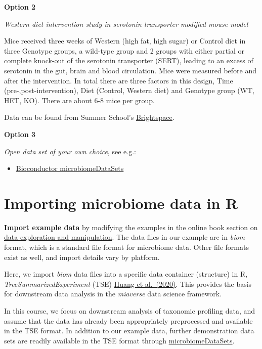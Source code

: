 \documentclass[
  oneside]{book}
\providecommand{\tightlist}{%
  \setlength{\itemsep}{0pt}\setlength{\parskip}{0pt}}
\begin{document}
\textbf{Option 2}

\emph{Western diet intervention study in serotonin transporter modified mouse model}

Mice received three weeks of Western (high fat, high sugar) or Control diet in
three Genotype groups, a wild-type group and 2 groups with either partial or
complete knock-out of the serotonin transporter (SERT), leading to an excess of
serotonin in the gut, brain and blood circulation. Mice were measured before
and after the intervention. In total there are three factors in this design,
Time (pre-,post-intervention), Diet (Control, Western diet) and Genotype group
(WT, HET, KO). There are about 6-8 mice per group.

Data can be found from Summer School's \href{https://brightspace.ru.nl/d2l/le/content/249077/Home}{Brightspace}.

\textbf{Option 3}

\emph{Open data set of your own choice}, see e.g.:

\begin{itemize}
\tightlist
\item
  \href{https://bioconductor.org/packages/release/data/experiment/html/microbiomeDataSets.html}{Bioconductor microbiomeDataSets}
\end{itemize}

\hypertarget{importing-microbiome-data-in-r}{%
\section{Importing microbiome data in R}\label{importing-microbiome-data-in-r}}

\textbf{Import example data} by modifying the examples in the online book
section on \href{https://microbiome.github.io/OMA/data-introduction.html\#loading-experimental-microbiome-data}{data exploration and
manipulation}. The
data files in our example are in \emph{biom} format, which is a standard
file format for microbiome data. Other file formats exist as well, and
import details vary by platform.

Here, we import \emph{biom} data files into a specific data container (structure)
in R, \emph{TreeSummarizedExperiment} (TSE) \href{https://f1000research.com/articles/9-1246}{Huang et
al.~(2020)}. This provides
the basis for downstream data analysis in the \emph{miaverse} data science
framework.

In this course, we focus on downstream analysis of taxonomic profiling
data, and assume that the data has already been appropriately
preprocessed and available in the TSE format. In addition to our
example data, further demonstration data sets are readily available in
the TSE format through
\href{https://bioconductor.org/packages/release/data/experiment/html/microbiomeDataSets.html}{microbiomeDataSets}.
\end{document}
